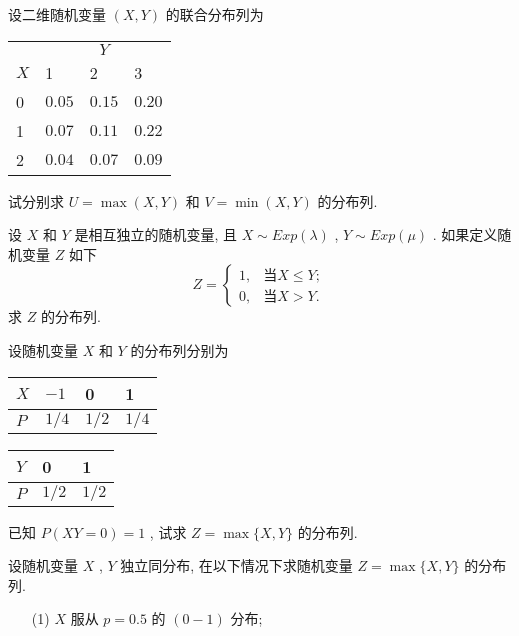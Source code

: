       \begin{xiti}
      	\item 设二维随机变量 $(X,Y)$ 的联合分布列为
      	\begin{center}
      		\begin{tabularx}{0.8\textwidth}{ZZZZ}
      			\hline
      			 & \\
      			 & 1 & 2 & 3\\
      			 & $0.05$ & $0.15$ & $0.20$\\
      			1 & $0.07$ & $0.11$ & $0.22$\\
      			2 & $0.04$ & $0.07$ & $0.09$\\
      			\hline
      		\end{tabularx}
      	\end{center}
      	试分别求 $U=\max(X,Y)$ 和 $V=\min(X,Y)$ 的分布列.
      	\item 设 $X$ 和 $Y$ 是相互独立的随机变量, 且 $X\sim Exp(\lambda)$ , $Y\sim Exp(\mu)$ . 如果定义随机变量 $Z$ 如下
      	\begin{equation*}
      		Z=\begin{cases}
      		1, & \text{当}X\leqslant Y;\\
      		0, & \text{当}X>Y.
      		\end{cases}
      	\end{equation*}
      	求 $Z$ 的分布列.
      	\item 设随机变量 $X$ 和 $Y$ 的分布列分别为
      	\begin{center}
      		\begin{tabularx}{0.4\textwidth}{Z|ZZZ}
      			$X$ & $-1$ & 0 & 1\\
      			\hline
      			$P$ & $1/4$ & $1/2$ & $1/4$
      		\end{tabularx}
      	\quad
      	    \begin{tabularx}{0.4\textwidth}{Z|ZZ}
      	    	$Y$ & 0 & 1\\
      	    	\hline
      	    	$P$ & $1/2$ & $1/2$
      	    \end{tabularx}
      	\end{center}
      已知 $P(XY=0)=1$ , 试求 $Z=\max\{X,Y\}$ 的分布列.
      \item 设随机变量 $X$ , $Y$ 独立同分布, 在以下情况下求随机变量 $Z=\max\{X,Y\}$ 的分布列.
      \begin{enumerate}
      	\item[(1)] $X$ 服从 $p=0.5$ 的 $(0-1)$ 分布;

\end{enumerate}
\end{xiti}
